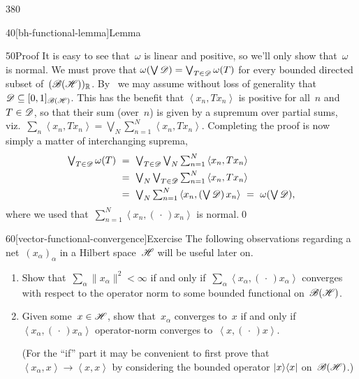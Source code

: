 \begin{parsec}{380}
\begin{point}{40}[bh-functional-lemma]{Lemma}
\begin{point}{50}{Proof}
It is easy to see that~$\omega$ is linear and positive,
so we'll only show that~$\omega$ is normal.
We must prove that $\omega(\bigvee \mathscr{D})=\bigvee_{T\in\mathscr{D}} \omega(T)$
for every bounded directed subset of~$(\mathscr{B}(\mathscr{H}))_{\mathbb{R}}$.
By~
we may assume without loss of generality that 
$\mathscr{D}\subseteq [0,1]_{\mathscr{B}(\mathscr{H})}$.
This has the benefit that $\left<x_n,T x_n\right>$
is positive for all~$n$ and~$T\in\mathscr{D}$,
so that their sum (over~$n$) is given by
a supremum over partial sums, viz.~$\sum_n\left<x_n,Tx_n\right>
=\bigvee_N\sum_{n=1}^N\left<x_n,Tx_n\right>$.
Completing the proof is now simply a matter of
interchanging suprema,
\begin{alignat*}{3}
	\textstyle \bigvee_{T\in \scrD} \omega(T)
	\ &=\ 
	\textstyle\bigvee_{T\in \scrD} \bigvee_N \sum_{n=1}^N 
	\left<x_n,Tx_n\right>\\
	\ &=\ 
	\textstyle\bigvee_N \bigvee_{T\in \scrD}\sum_{n=1}^N 
	\left<x_n,Tx_n\right>\\
	\ &=\ 
	\textstyle\bigvee_N \sum_{n=1}^N \left<x_n,(\bigvee \scrD )\,x_n\right>
	\ =\ \textstyle\omega(\bigvee\scrD),
\end{alignat*}
where we used that~$\sum_{n=1}^N \left<x_n,(\,\cdot\,)x_n\right>$
is normal.\qed
\end{point}
\end{point}
\begin{point}{60}[vector-functional-convergence]{Exercise}%
The following observations
regarding
a net~$(x_\alpha)_\alpha$ in a Hilbert space~$\mathscr{H}$
will be useful later on.
\begin{enumerate}
\item
Show that~$\sum_\alpha \|x_\alpha\|^2<\infty$
if and only if~$\sum_\alpha \left<x_\alpha,(\,\cdot\,)x_\alpha\right>$
converges with respect to the operator norm
to some bounded functional on~$\mathscr{B}(\mathscr{H})$.
\item
Given some~$x\in \mathscr{H}$,
show that~$x_\alpha$ converges to~$x$
if and only if  $\left<x_\alpha,(\,\cdot\,)x_\alpha\right>$
operator-norm converges to~$\left<x,(\,\cdot\,)x\right>$.

(For the ``if'' part it may be convenient
to first prove that $\left<x_\alpha,x\right>\to \left<x,x\right>$
by considering the bounded operator
$\left|x\right>\!\left<x\right|$ on~$\mathscr{B}(\mathscr{H})$.)

\end{enumerate}
\end{point}
\end{parsec}
